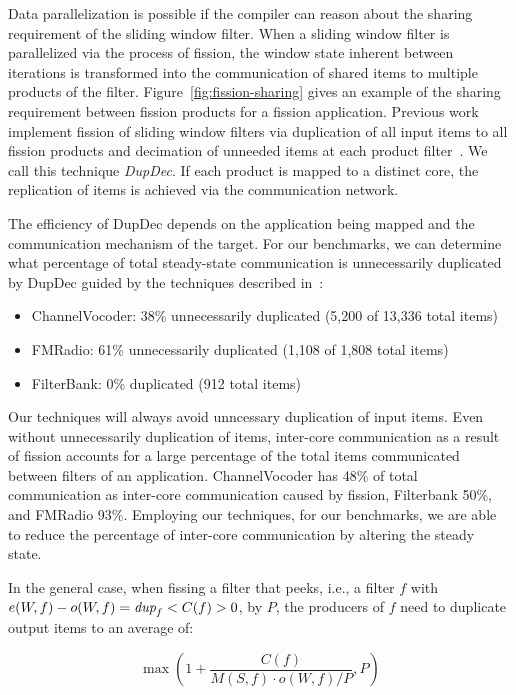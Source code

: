 Data parallelization is possible if the compiler can reason about the
sharing requirement of the sliding window filter.  When a sliding
window filter is parallelized via the process of fission, the window
state inherent between iterations is transformed into the
communication of shared items to multiple products of the filter.
Figure~\ref{fig:fission-sharing} gives an example of the sharing
requirement between fission products for a fission application. 
Previous work implement fission of sliding window filters via
duplication of all input items to all fission products and decimation
of unneeded items at each product filter~\cite{streamit-asplos}.  We
call this technique {\it DupDec}. If each product is mapped to a
distinct core, the replication of items is achieved via the
communication network.

The efficiency of DupDec depends on the application being mapped and
the communication mechanism of the target. For our benchmarks, we can
determine what percentage of total steady-state communication is
unnecessarily duplicated by DupDec guided by the techniques described
in~\cite{gordon-asplos06}:

\begin{itemize}
\item ChannelVocoder: 38\% unnecessarily duplicated (5,200 of 13,336
      total items)
\item FMRadio: 61\% unnecessarily duplicated (1,108 of
      1,808 total items) 
\item FilterBank: 0\% duplicated (912 total items)
\end{itemize}

Our techniques will always avoid unncessary duplication of input
items.  Even without unnecessarily duplication of items, inter-core
communication as a result of fission accounts for a large percentage
of the total items communicated between filters of an application.
ChannelVocoder has 48\% of total communication as inter-core
communication caused by fission, Filterbank 50\%, and FMRadio 93\%.
Employing our techniques, for our benchmarks, we are able to reduce
the percentage of inter-core communication by altering the steady
state.

In the general case, when fissing a filter that peeks, i.e., a filter
$f$ with $e(W, f) - o(W, f) = \mbox{\it dup}_f < C(f) > 0$, by $P$, the producers
of $f$ need to duplicate output items to an average of:

\[ \max \left ( 1 + \frac{C(f)}{M(S, f) \cdot o(W, f) / P}, P \right )\]

